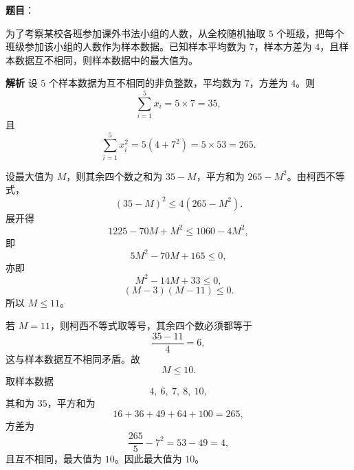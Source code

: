 \begin{answer}

\textbf{题目}：

为了考察某校各班参加课外书法小组的人数，从全校随机抽取 $5$ 个班级，把每个班级参加该小组的人数作为样本数据。已知样本平均数为 $7$，样本方差为 $4$，且样本数据互不相同，则样本数据中的最大值为\gkblank{}。

\textbf{解析}
设 $5$ 个样本数据为互不相同的非负整数，平均数为 $7$，方差为 $4$。则
\nopagebreak[4]
\[\sum_{i=1}^5x_i=5\times7=35,\]
且
\nopagebreak[4]
\[\sum_{i=1}^5x_i^2=5\left(4+7^2\right)=5\times53=265.\]

设最大值为 $M$，则其余四个数之和为 $35-M$，平方和为 $265-M^2$。由柯西不等式，
\nopagebreak[4]
\[(35-M)^2\leqslant4(265-M^2).\]
展开得
\nopagebreak[4]
\[1225-70M+M^2\leqslant1060-4M^2,\]
即
\nopagebreak[4]
\[5M^2-70M+165\leqslant0,\]
亦即
\nopagebreak[4]
\[M^2-14M+33\leqslant0,\]
\nopagebreak[4]
\[(M-3)(M-11)\leqslant0.\]
所以 $M\leqslant11$。

若 $M=11$，则柯西不等式取等号，其余四个数必须都等于
\nopagebreak[4]
\[\frac{35-11}4=6,\]
这与样本数据互不相同矛盾。故
\nopagebreak[4]
\[M\leqslant10.\]
取样本数据
\nopagebreak[4]
\[4,\ 6,\ 7,\ 8,\ 10,\]
其和为 $35$，平方和为
\nopagebreak[4]
\[16+36+49+64+100=265,\]
方差为
\nopagebreak[4]
\[\frac{265}5-7^2=53-49=4,\]
且互不相同，最大值为 $10$。因此最大值为 $10$。


\end{answer}
